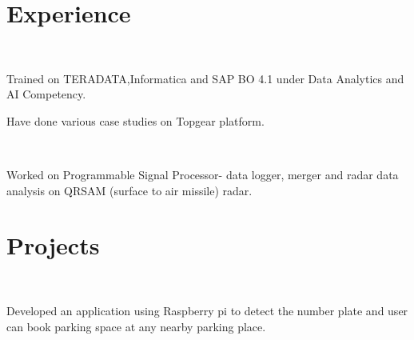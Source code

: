 \documentclass[a4paper]{deedy-resume} %
\begin{document}
\begin{minipage}[t]{0.66\textwidth} %


\section{Experience}


\\
\vspace{\topsep} %
\begin{tightitemize}
\item Trained on TERADATA,Informatica and SAP BO 4.1 under Data Analytics and AI Competency.
\item Have done various case studies on Topgear platform.

\end{tightitemize}

\\
\begin{tightitemize}
\item Worked on Programmable Signal Processor- data logger, merger and radar data analysis on QRSAM (surface to air missile) radar.
\end{tightitemize}


\section{Projects}

\\

\begin{tightitemize}
\item Developed an application using Raspberry pi to detect the number plate and user can book parking space at any nearby parking place.
\end{tightitemize}
\sectionspace


\end{minipage}
\end{document}
